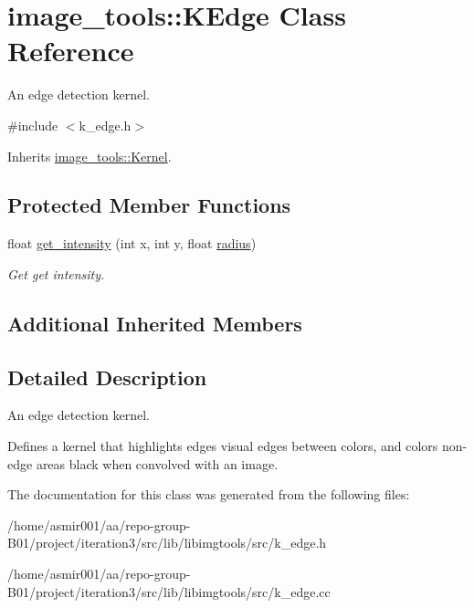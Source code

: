 \hypertarget{classimage__tools_1_1KEdge}{}\section{image\+\_\+tools\+:\+:K\+Edge Class Reference}
\label{classimage__tools_1_1KEdge}


An edge detection kernel.  




{\ttfamily \#include $<$k\+\_\+edge.\+h$>$}



Inherits \hyperlink{classimage__tools_1_1Kernel}{image\+\_\+tools\+::\+Kernel}.

\subsection*{Protected Member Functions}
\begin{DoxyCompactItemize}
\item 
float \hyperlink{classimage__tools_1_1KEdge_ac980938c27aeb2ea927fd7847dd5b020}{get\+\_\+intensity} (int x, int y, float \hyperlink{classimage__tools_1_1Kernel_ac834d16a242dd4a15f5f5e4a6dacea01}{radius})\hypertarget{classimage__tools_1_1KEdge_ac980938c27aeb2ea927fd7847dd5b020}{}\label{classimage__tools_1_1KEdge_ac980938c27aeb2ea927fd7847dd5b020}

\begin{DoxyCompactList}\small\item\em Get get intensity. \end{DoxyCompactList}\end{DoxyCompactItemize}
\subsection*{Additional Inherited Members}


\subsection{Detailed Description}
An edge detection kernel. 

Defines a kernel that highlights edges visual edges between colors, and colors non-\/edge areas black when convolved with an image. 

The documentation for this class was generated from the following files\+:\begin{DoxyCompactItemize}
\item 
/home/asmir001/aa/repo-\/group-\/\+B01/project/iteration3/src/lib/libimgtools/src/k\+\_\+edge.\+h\item 
/home/asmir001/aa/repo-\/group-\/\+B01/project/iteration3/src/lib/libimgtools/src/k\+\_\+edge.\+cc\end{DoxyCompactItemize}
